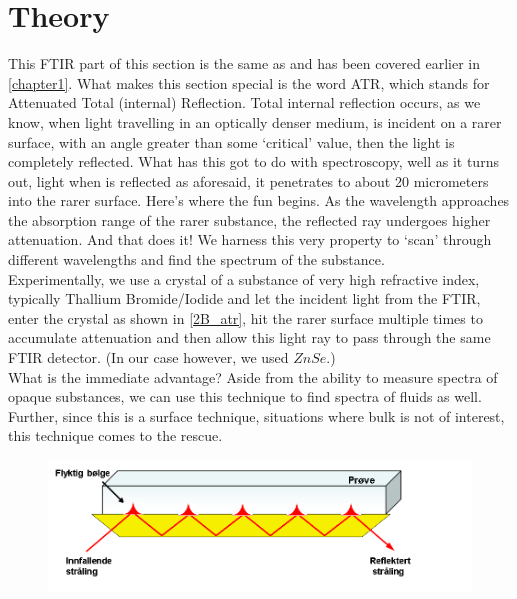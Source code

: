 \section{Theory}
	This FTIR part of this section is the same as and has been covered earlier in \autoref{chapter1}. What makes this section special is the word ATR, which stands for Attenuated Total (internal) Reflection. Total internal reflection occurs, as we know, when light travelling in an optically denser medium, is incident on a rarer surface, with an angle greater than some `critical' value, then the light is completely reflected. What has this got to do with spectroscopy, well as it turns out, light when is reflected as aforesaid, it penetrates to about 20 micrometers into the rarer surface. Here's where the fun begins. As the wavelength approaches the absorption range of the rarer substance, the reflected ray undergoes higher attenuation. And that does it! We harness this very property to `scan' through different wavelengths and find the spectrum of the substance.\\
	Experimentally, we use a crystal of a substance of very high refractive index, typically Thallium Bromide/Iodide and let the incident light from the FTIR, enter the crystal as shown in \autoref{2B_atr}, hit the rarer surface multiple times to accumulate attenuation and then allow this light ray to pass through the same FTIR detector. (In our case however, we used $ZnSe$.)\\
	What is the immediate advantage? Aside from the ability to measure spectra of opaque substances, we can use this technique to find spectra of fluids as well. Further, since this is a surface technique, situations where bulk is not of interest, this technique comes to the rescue.

	\begin{figure}[bth]
		\begin{center}
			\includegraphics[width=0.8\linewidth]{gfx/02B_atr}
		\end{center}
	\caption[ATR principle]{\label{2B_atr}}
	\end{figure}

